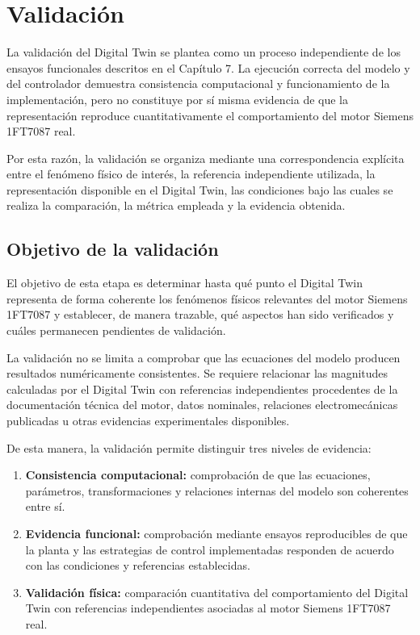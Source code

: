 \section{Validación}

La validación del Digital Twin se plantea como un proceso independiente de los ensayos funcionales descritos en el Capítulo 7. La ejecución correcta del modelo y del controlador demuestra consistencia computacional y funcionamiento de la implementación, pero no constituye por sí misma evidencia de que la representación reproduce cuantitativamente el comportamiento del motor Siemens 1FT7087 real.

Por esta razón, la validación se organiza mediante una correspondencia explícita entre el fenómeno físico de interés, la referencia independiente utilizada, la representación disponible en el Digital Twin, las condiciones bajo las cuales se realiza la comparación, la métrica empleada y la evidencia obtenida.

\subsection{Objetivo de la validación}

El objetivo de esta etapa es determinar hasta qué punto el Digital Twin representa de forma coherente los fenómenos físicos relevantes del motor Siemens 1FT7087 y establecer, de manera trazable, qué aspectos han sido verificados y cuáles permanecen pendientes de validación.

La validación no se limita a comprobar que las ecuaciones del modelo producen resultados numéricamente consistentes. Se requiere relacionar las magnitudes calculadas por el Digital Twin con referencias independientes procedentes de la documentación técnica del motor, datos nominales, relaciones electromecánicas publicadas u otras evidencias experimentales disponibles.

De esta manera, la validación permite distinguir tres niveles de evidencia:

\begin{enumerate}

\item \textbf{Consistencia computacional:} comprobación de que las ecuaciones, parámetros, transformaciones y relaciones internas del modelo son coherentes entre sí.

\item \textbf{Evidencia funcional:} comprobación mediante ensayos reproducibles de que la planta y las estrategias de control implementadas responden de acuerdo con las condiciones y referencias establecidas.

\item \textbf{Validación física:} comparación cuantitativa del comportamiento del Digital Twin con referencias independientes asociadas al motor Siemens 1FT7087 real.

\end{enumerate}

